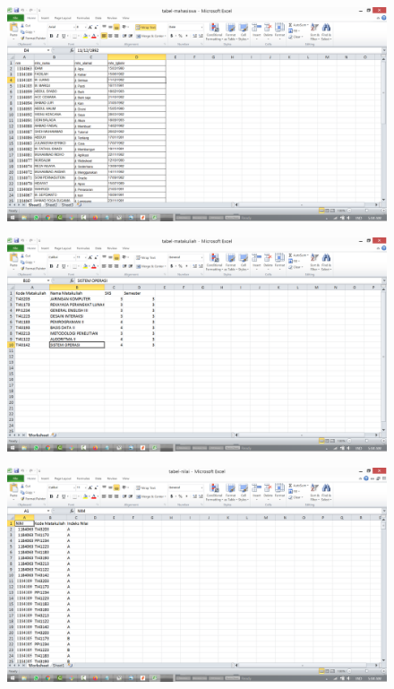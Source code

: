 \documentclass[11pt]{article}
\begin{document}
\begin{enumerate}
\newpage
\begin{figure}[h]
        \centerline{\includegraphics[scale=0.1]{img/t3.png}}
        \caption{}
        \centering
	\label{langkah3}
	\end{figure}
\begin{figure}[h]
        \centerline{\includegraphics[scale=0.1]{img/t4.png}}
        \caption{}
        \centering
	\label{langkah4}
	\end{figure}

\newpage
\begin{figure}[h]
        \centerline{\includegraphics[scale=0.1]{img/t5.png}}
        \caption{}
        \centering
	\label{langkah5}
	\end{figure}


\end{enumerate}
\end{document}
